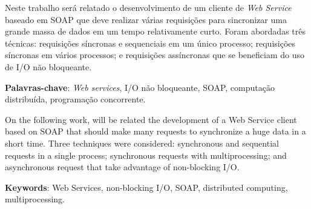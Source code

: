 %
%


Neste trabalho será relatado o desenvolvimento de um cliente de \textit{Web Service} baseado em SOAP que deve realizar várias requisições para sincronizar uma grande massa de dados em um tempo relativamente curto. Foram abordadas três técnicas: requisições síncronas e sequenciais em um único processo; requisições síncronas em vários processos; e requisições assíncronas que se beneficiam do uso de I/O não bloqueante.

\vspace{1.5ex}

{\bf Palavras-chave}: \textit{Web services}, I/O não bloqueante, SOAP, computação distribuída, programação concorrente.
%
%


On the following work, will be related the development of a Web Service client based on SOAP that should make many requests to synchronize a huge data in a short time. Three techniques were considered: synchronous and sequential requests in a single process; synchronous requests with multiprocessing; and asynchronous request that take advantage of non-blocking I/O.

\vspace{1.5ex}

{\bf Keywords}: Web Services, non-blocking I/O, SOAP, distributed computing, multiprocessing.
